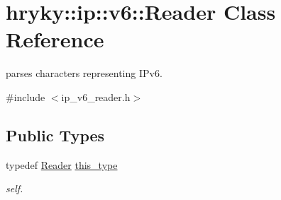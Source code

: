 \hypertarget{classhryky_1_1ip_1_1v6_1_1_reader}{\section{hryky\-:\-:ip\-:\-:v6\-:\-:Reader Class Reference}
\label{classhryky_1_1ip_1_1v6_1_1_reader}
}


parses characters representing I\-Pv6.  




{\ttfamily \#include $<$ip\-\_\-v6\-\_\-reader.\-h$>$}

\subsection*{Public Types}
\begin{DoxyCompactItemize}
\item 
\hypertarget{classhryky_1_1ip_1_1v6_1_1_reader_a8e77e03500cfbbc0da2b0bc14f30c0d8}{typedef \hyperlink{classhryky_1_1ip_1_1v6_1_1_reader}{Reader} \hyperlink{classhryky_1_1ip_1_1v6_1_1_reader_a8e77e03500cfbbc0da2b0bc14f30c0d8}{this\-\_\-type}}\label{classhryky_1_1ip_1_1v6_1_1_reader_a8e77e03500cfbbc0da2b0bc14f30c0d8}

\begin{DoxyCompactList}\small\item\em self. \end{DoxyCompactList}\end{DoxyCompactItemize}
